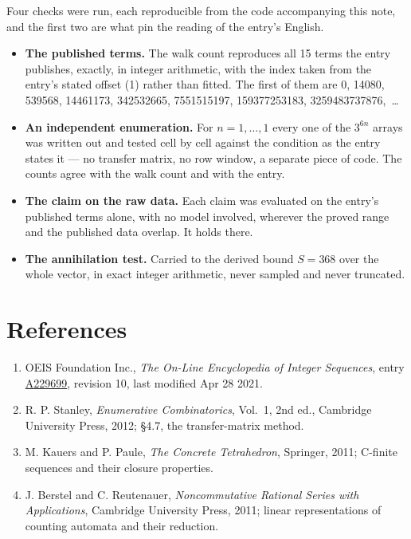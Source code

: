 \documentclass[11pt]{article}
\theoremstyle{definition}
\begin{document}
Four checks were run, each reproducible from the code accompanying this note, and the first two are what pin the reading of the entry's English.

\begin{itemize}

\item {\bfseries The published terms.} The walk count reproduces all 15 terms the entry publishes, exactly, in integer arithmetic, with the index taken from the entry's stated offset (1) rather than fitted. The first of them are 0, 14080, 539568, 14461173, 342532665, 7551515197, 159377253183, 3259483737876,~\dots

\item {\bfseries An independent enumeration.} For $n = 1,\dots,1$ every one of the $3^{6n}$ arrays was written out and tested cell by cell against the condition as the entry states it --- no transfer matrix, no row window, a separate piece of code. The counts agree with the walk count and with the entry.

\item {\bfseries The claim on the raw data.} Each claim was evaluated on the entry's published terms alone, with no model involved, wherever the proved range and the published data overlap. It holds there.

\item {\bfseries The annihilation test.} Carried to the derived bound $S = 368$ over the whole vector, in exact integer arithmetic, never sampled and never truncated.

\end{itemize}

\section{References}

\begin{enumerate}

\item OEIS Foundation Inc., \emph{The On-Line Encyclopedia of Integer Sequences}, entry \href{https://oeis.org/A229699}{A229699}, revision 10, last modified Apr 28 2021.

\item R. P. Stanley, \emph{Enumerative Combinatorics}, Vol.~1, 2nd ed., Cambridge University Press, 2012; \S4.7, the transfer-matrix method.

\item M. Kauers and P. Paule, \emph{The Concrete Tetrahedron}, Springer, 2011; C-finite sequences and their closure properties.

\item J. Berstel and C. Reutenauer, \emph{Noncommutative Rational Series with Applications}, Cambridge University Press, 2011; linear representations of counting automata and their reduction.

\end{enumerate}
\end{document}
